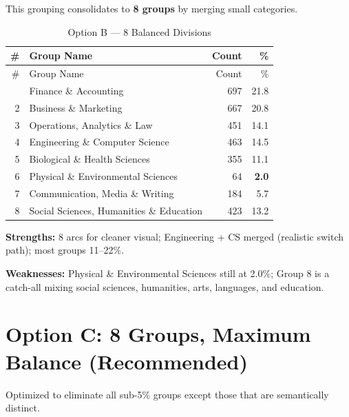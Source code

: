 \documentclass[
  11pt,
  letterpaper,
]{report}
\begin{document}
This grouping consolidates to \textbf{8 groups} by merging small
categories.

\begin{longtable}[]{@{}rlrr@{}}
\caption{Option B --- 8 Balanced
Divisions}\label{tbl-optionB}\tabularnewline
\toprule\noalign{}
\# & Group Name & Count & \% \\
\midrule\noalign{}
\endfirsthead
\toprule\noalign{}
\# & Group Name & Count & \% \\
\midrule\noalign{}
\endhead
\bottomrule\noalign{}
\endlastfoot
1 & Finance \& Accounting & 697 & 21.8 \\
2 & Business \& Marketing & 667 & 20.8 \\
3 & Operations, Analytics \& Law & 451 & 14.1 \\
4 & Engineering \& Computer Science & 463 & 14.5 \\
5 & Biological \& Health Sciences & 355 & 11.1 \\
6 & Physical \& Environmental Sciences & 64 & \textbf{2.0} \\
7 & Communication, Media \& Writing & 184 & 5.7 \\
8 & Social Sciences, Humanities \& Education & 423 & 13.2 \\
\end{longtable}

\textbf{Strengths:} 8 arcs for cleaner visual; Engineering + CS merged
(realistic switch path); most groups 11--22\%.

\textbf{Weaknesses:} Physical \& Environmental Sciences still at 2.0\%;
Group 8 is a catch-all mixing social sciences, humanities, arts,
languages, and education.

\section{Option C: 8 Groups, Maximum Balance
(Recommended)}\label{sec-optionC}

Optimized to eliminate all sub-5\% groups except those that are
semantically distinct.
\end{document}
